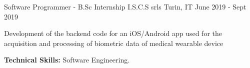 \begin{cventries}
  \cventry
    {Software Programmer - B.Sc Internship} %
    {I.S.C.S srls} %
    {Turin, IT} %
    {June 2019 - Sept 2019} %
    {
      \begin{cvitems} %
        \item {Development of the backend code for an iOS/Android app used for the acquisition and processing of biometric data of medical wearable device}
        \item {\textbf{Technical Skills:} Software Engineering.}
      \end{cvitems}
    }

\end{cventries}

